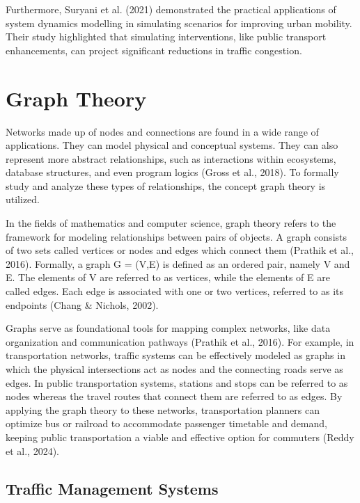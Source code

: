 Furthermore, Suryani et al. (2021) demonstrated the practical applications of system dynamics modelling in simulating scenarios for improving urban mobility. Their study highlighted that simulating interventions, like public transport enhancements, can project significant reductions in traffic congestion.


\section{Graph Theory}
\label{chap:graph_theory}

Networks made up of nodes and connections are found in a wide range of applications. They can model physical and conceptual systems. They can also represent more abstract relationships, such as interactions within ecosystems, database structures, and even program logics (Gross et al., 2018). To formally study and analyze these types of relationships, the concept graph theory is utilized.

In the fields of mathematics and computer science, graph theory refers to the framework for modeling relationships between pairs of objects. A graph consists of two sets called vertices or nodes and edges which connect them (Prathik et al., 2016). Formally, a graph G = (V,E) is defined as an ordered pair, namely V and E. The elements of V are referred to as vertices, while the elements of E are called edges. Each edge is associated with one or two vertices, referred to as its endpoints (Chang \& Nichols, 2002). 

Graphs serve as foundational tools for mapping complex networks, like data organization and communication pathways (Prathik et al., 2016). For example, in transportation networks, traffic systems can be effectively modeled as graphs in which the physical intersections act as nodes and the connecting roads serve as edges. In public transportation systems, stations and stops can be referred to as nodes whereas the travel routes that connect them are referred to as edges. By applying the graph theory to these networks, transportation planners can optimize bus or railroad to accommodate passenger timetable and demand, keeping public transportation a viable and effective option for commuters (Reddy et al., 2024). 


\subsection{Traffic Management Systems}
\label{chap:traffic_management_systems}

